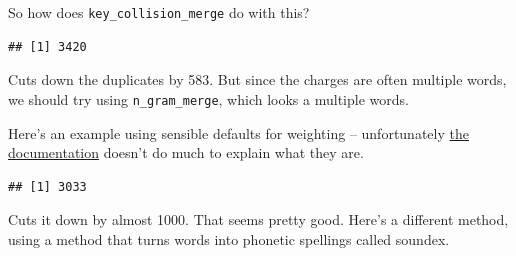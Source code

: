 \documentclass[]{book}
\newenvironment{Shaded}{\begin{snugshade}}{\end{snugshade}}
\newcommand{\DataTypeTok}[1]{\textcolor[rgb]{0.13,0.29,0.53}{#1}}
\newcommand{\DecValTok}[1]{\textcolor[rgb]{0.00,0.00,0.81}{#1}}
\newcommand{\FloatTok}[1]{\textcolor[rgb]{0.00,0.00,0.81}{#1}}
\newcommand{\KeywordTok}[1]{\textcolor[rgb]{0.13,0.29,0.53}{\textbf{#1}}}
\newcommand{\NormalTok}[1]{#1}
\newcommand{\OperatorTok}[1]{\textcolor[rgb]{0.81,0.36,0.00}{\textbf{#1}}}
\newcommand{\StringTok}[1]{\textcolor[rgb]{0.31,0.60,0.02}{#1}}
\begin{document}
So how does \texttt{key\_collision\_merge} do with this?

\begin{Shaded}
\end{Shaded}

\begin{verbatim}
## [1] 3420
\end{verbatim}

Cuts down the duplicates by 583. But since the charges are often multiple words, we should try using \texttt{n\_gram\_merge}, which looks a multiple words.

Here's an example using sensible defaults for weighting -- unfortunately \href{https://github.com/ChrisMuir/refinr}{the documentation} doesn't do much to explain what they are.

\begin{Shaded}
\end{Shaded}

\begin{verbatim}
## [1] 3033
\end{verbatim}

Cuts it down by almost 1000. That seems pretty good. Here's a different method, using a method that turns words into phonetic spellings called soundex.
\end{document}
